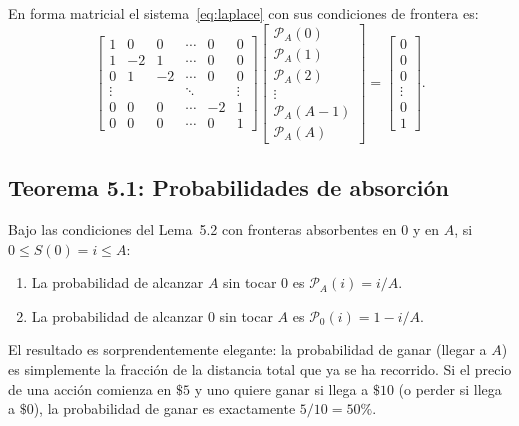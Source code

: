 \documentclass[12pt]{article}
\begin{document}
En forma matricial el sistema~\eqref{eq:laplace} con sus condiciones de frontera es:
\begin{equation*}
  \begin{bmatrix}
    1 & 0 & 0 & \cdots & 0 & 0 \\
    1 & -2 & 1 & \cdots & 0 & 0 \\
    0 & 1 & -2 & \cdots & 0 & 0 \\
    \vdots & & & \ddots & & \vdots \\
    0 & 0 & 0 & \cdots & -2 & 1 \\
    0 & 0 & 0 & \cdots & 0 & 1
  \end{bmatrix}
  \begin{bmatrix} \mathcal{P}_A(0) \\ \mathcal{P}_A(1) \\ \mathcal{P}_A(2) \\ \vdots \\
  \mathcal{P}_A(A-1) \\ \mathcal{P}_A(A) \end{bmatrix}
  =
  \begin{bmatrix} 0 \\ 0 \\ 0 \\ \vdots \\ 0 \\ 1 \end{bmatrix}.
\end{equation*}

\subsection{Teorema 5.1: Probabilidades de absorci\'on}

\begin{tcolorbox}[colback=gray!5, colframe=gray!50, title=\textbf{Teorema~5.1}]
Bajo las condiciones del Lema~5.2 con fronteras absorbentes en $0$ y en $A$,
si $0 \leq S(0) = i \leq A$:
\begin{enumerate}
  \item La probabilidad de alcanzar $A$ sin tocar $0$ es $\mathcal{P}_A(i) = i/A$.
  \item La probabilidad de alcanzar $0$ sin tocar $A$ es $\mathcal{P}_0(i) = 1 - i/A$.
\end{enumerate}
\end{tcolorbox}

\begin{intuicion}
El resultado es sorprendentemente elegante: la probabilidad de ganar (llegar a $A$)
es simplemente la fracci\'on de la distancia total que ya se ha recorrido.
Si el precio de una acci\'on comienza en $\$5$ y uno quiere ganar si llega a $\$10$
(o perder si llega a $\$0$), la probabilidad de ganar es exactamente $5/10 = 50\%$.
\end{intuicion}
\end{document}

